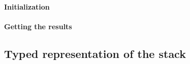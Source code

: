 \documentclass[twoside,a4paper]{article}
\begin{document}


\paragraph{Initialization}


\paragraph{Getting the results}



\subsection{Typed representation of the stack}



\end{document}
